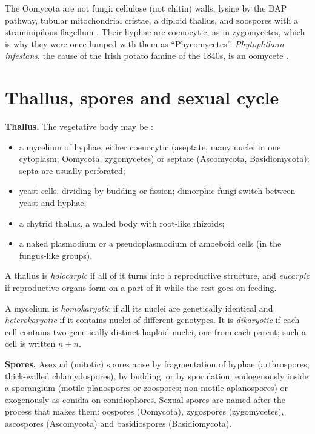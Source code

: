 The
Oomycota are not fungi: cellulose (not
chitin) walls, lysine by the DAP pathway,
tubular mitochondrial cristae, a diploid
thallus, and zoospores with a
straminipilous flagellum
\cite[Chapter 4]{webster2007fungi}.
Their hyphae are coenocytic, as in
zygomycetes, which is why they were once
lumped with them as ``Phycomycetes''.
\emph{Phytophthora infestans}, the cause of
the Irish potato famine of the 1840s, is an
oomycete \cite[Chapter 1]{deacon2006fungal}.

\section{Thallus, spores and sexual cycle}
\label{section-thallus-spores}

\textbf{Thallus.}
The vegetative body may be
\cite[Section 1.1]{webster2007fungi}:
\begin{itemize}
\item a mycelium of hyphae, either
coenocytic (aseptate, many nuclei in one
cytoplasm; Oomycota, zygomycetes) or septate
(Ascomycota, Basidiomycota); septa are
usually perforated;
\item yeast cells, dividing by budding or
fission; dimorphic fungi switch between
yeast and hyphae;
\item a chytrid thallus, a walled body with
root-like rhizoids;
\item a naked plasmodium or a
pseudoplasmodium of amoeboid cells (in the
fungus-like groups).
\end{itemize}
A thallus is \emph{holocarpic} if all of it
turns into a reproductive structure, and
\emph{eucarpic} if reproductive organs form
on a part of it while the rest goes on
feeding.

\begin{definition}
\label{definition-dikaryon}
A mycelium is \emph{homokaryotic} if all its
nuclei are genetically identical and
\emph{heterokaryotic} if it contains nuclei
of different genotypes. It is
\emph{dikaryotic} if each cell contains two
genetically distinct haploid nuclei, one
from each parent; such a cell is written
$n+n$.
\end{definition}

\textbf{Spores.}
Asexual (mitotic) spores arise by
fragmentation of hyphae (arthrospores,
thick-walled chlamydospores), by budding, or
by sporulation: endogenously inside a
sporangium (motile planospores or zoospores;
non-motile aplanospores) or exogenously as
conidia on conidiophores. Sexual spores are
named after the process that makes them:
oospores (Oomycota), zygospores
(zygomycetes), ascospores (Ascomycota) and
basidiospores (Basidiomycota).

